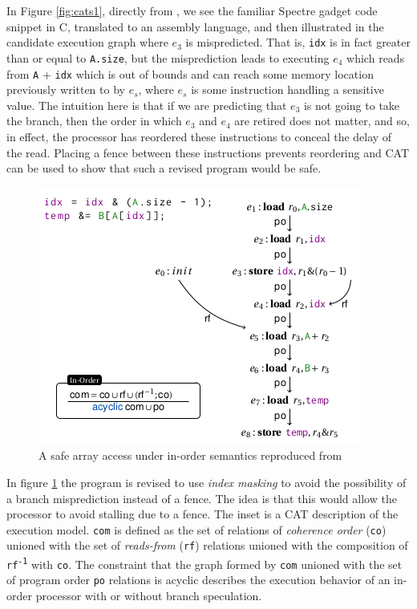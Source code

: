 \documentclass[11pt,conference]{IEEEtran}
\begin{document}
In Figure \ref{fig:cats1}, directly from \cite{cats2022}, we see the familiar Spectre gadget code snippet in C, translated to an assembly language, and then illustrated in the candidate execution graph where $e_3$ is mispredicted.
That is, \texttt{idx} is in fact greater than or equal to \texttt{A.size}, but the misprediction leads to executing $e_4$ which reads from \texttt{A} + \texttt{idx} which is out of bounds and can reach some memory location previously written to by $e_s$, where $e_s$ is some instruction handling a sensitive value.
The intuition here is that if we are predicting that $e_3$ is not going to take the branch, then the order in which $e_3$ and $e_4$ are retired does not matter, and so, in effect, the processor has reordered these instructions to conceal the delay of the read.
Placing a fence between these instructions prevents reordering and CAT can be used to show that such a revised program would be safe.

\begin{figure}[t]
  \centering
  \includegraphics[width=0.9\linewidth]{cats2}
	\caption{A safe array access under in-order semantics reproduced from \cite{cats2022}}
  \label{fig:cats2}
\end{figure}

In figure \ref{fig:cats2} the program is revised to use \emph{index masking} to avoid the possibility of a branch misprediction instead of a fence.
The idea is that this would allow the processor to avoid stalling due to a fence.
The inset is a CAT description of the execution model.
\texttt{com} is defined as the set of relations of \emph{coherence order} (\texttt{co}) unioned with the set of \emph{reads-from} (\texttt{rf}) relations unioned with the composition of \texttt{rf\textsuperscript{-1}} with \texttt{co}.
The constraint that the graph formed by \texttt{com} unioned with the set of program order \texttt{po} relations is acyclic describes the execution behavior of an in-order processor with or without branch speculation.
\end{document}
